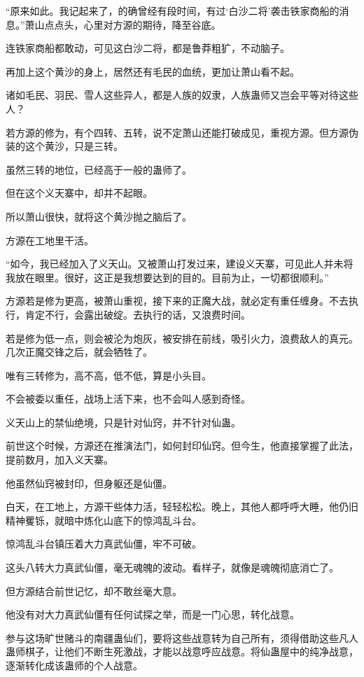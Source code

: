 \begin{this_body}
“原来如此。我记起来了，的确曾经有段时间，有过‘白沙二将’袭击铁家商船的消息。”萧山点点头，心里对方源的期待，降至谷底。

连铁家商船都敢动，可见这白沙二将，都是鲁莽粗犷，不动脑子。

再加上这个黄沙的身上，居然还有毛民的血统，更加让萧山看不起。

诸如毛民、羽民、雪人这些异人，都是人族的奴隶，人族蛊师又岂会平等对待这些人？

若方源的修为，有个四转、五转，说不定萧山还能打破成见，重视方源。但方源伪装的这个黄沙，只是三转。

虽然三转的地位，已经高于一般的蛊师了。

但在这个义天寨中，却并不起眼。

所以萧山很快，就将这个黄沙抛之脑后了。

方源在工地里干活。

“如今，我已经加入了义天山。又被萧山打发过来，建设义天寨，可见此人并未将我放在眼里。很好，这正是我想要达到的目的。目前为止，一切都很顺利。”

方源若是修为更高，被萧山重视，接下来的正魔大战，就必定有重任缠身。不去执行，肯定不行，会露出破绽。去执行的话，又浪费时间。

若是修为低一点，则会被沦为炮灰，被安排在前线，吸引火力，浪费敌人的真元。几次正魔交锋之后，就会牺牲了。

唯有三转修为，高不高，低不低，算是小头目。

不会被委以重任，战场上活下来，也不会叫人感到奇怪。

义天山上的禁仙绝境，只是针对仙窍，并不针对仙蛊。

前世这个时候，方源还在推演法门，如何封印仙窍。但今生，他直接掌握了此法，提前数月，加入义天寨。

他虽然仙窍被封印，但身躯还是仙僵。

白天，在工地上，方源干些体力活，轻轻松松。晚上，其他人都呼呼大睡，他仍旧精神矍铄，就暗中炼化山底下的惊鸿乱斗台。

惊鸿乱斗台镇压着大力真武仙僵，牢不可破。

这头八转大力真武仙僵，毫无魂魄的波动。看样子，就像是魂魄彻底消亡了。

但方源结合前世记忆，却不敢丝毫大意。

他没有对大力真武仙僵有任何试探之举，而是一门心思，转化战意。

参与这场旷世赌斗的南疆蛊仙们，要将这些战意转为自己所有，须得借助这些凡人蛊师棋子，让他们不断生死激战，才能以战意呼应战意。将仙蛊屋中的纯净战意，逐渐转化成该蛊师的个人战意。


\end{this_body}
